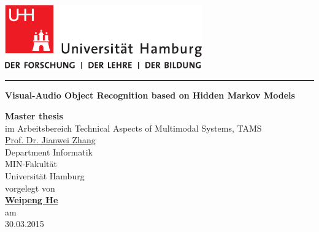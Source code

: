 \documentclass[12pt,final,twoside]{report}
\author{\trauthor}
\makeatletter
\newcommand{\trtitle}{Visual-Audio Object Recognition based on Hidden Markov Models}
\newcommand{\trtype}{Master thesis} %
\newcommand{\trauthor}{Weipeng He}
\newcommand{\trauthortitle}{} %
\newcommand{\tremail}{2he@informatik.uni-hamburg.de}
\newcommand{\trgutachterA}{\href{mailto:zhang@informatik.uni-hamburg.de}{Prof. Dr. Jianwei Zhang}}
\newcommand{\trfach}{Technical Aspects of Multimodal Systems, TAMS}
\newcommand{\trdate}{30.03.2015}
\theoremstyle{plain}
\theoremstyle{definition}
\theoremstyle{remark}
\makeatother
\begin{document}
\renewcommand{\headheight}{14.5pt}      %

\thispagestyle{empty}
\fancyhead[LO,RE]{}                     %


\begin{titlepage}
    \begin{flushleft}
        \includegraphics[width=85mm]{uhhLogoL.pdf}\\
    \end{flushleft}
    \rule{\textwidth}{0.4pt}
        \newline
        \vspace{2.0cm}
        \begin{center}
          \LARGE \textbf{\trtitle}
        \end{center}
    \vspace{2.0cm}
    \begin{center}
      \textbf{\trtype}\\
      im Arbeitsbereich \trfach\\
      \trgutachterA\medskip\\
      Department Informatik\\
      MIN-Fakult\"at\\
      Universit\"at Hamburg \\[0.5cm]
      vorgelegt von \\
      \textbf{\trauthortitle\href{mailto:\tremail}{\trauthor}}\\
      am\\
      \trdate
    \end{center}

\end{titlepage}
\end{document}
